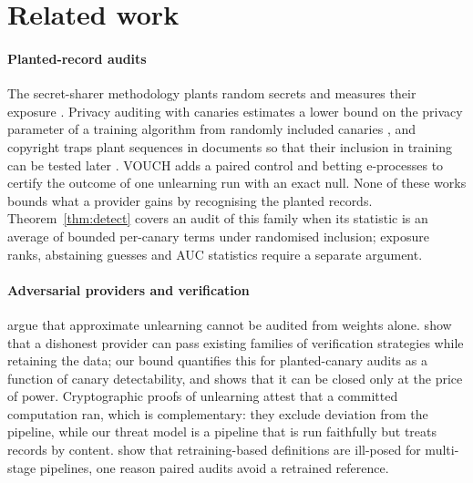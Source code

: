 \section{Related work}\label{sec:related}

\paragraph{Planted-record audits} The secret-sharer methodology plants random secrets and
measures their exposure \citep{carlini2019secret}. Privacy auditing with canaries estimates a
lower bound on the privacy parameter of a training algorithm from randomly included canaries
\citep{steinke2023privacy}, and copyright traps plant sequences in documents so that their
inclusion in training can be tested later \citep{meeus2024traps}. VOUCH
\citep{dang2026vouch} adds a paired control and betting e-processes
\citep{waudbysmith2024,ramdas2023game,shafer2021testing,grunwald2024safe} to certify the
outcome of one unlearning run with an exact null. None of these works bounds what a provider gains
by recognising the planted records. Theorem~\ref{thm:detect} covers an audit of this family
when its statistic is an average of bounded per-canary terms under randomised inclusion;
exposure ranks, abstaining guesses and AUC statistics require a separate argument.

\paragraph{Adversarial providers and verification} \citet{thudi2022necessity} argue that
approximate unlearning cannot be audited from weights alone. \citet{zhang2024verification}
show that a dishonest provider can pass existing families of verification strategies while
retaining the data; our bound quantifies this for planted-canary audits as a function of
canary detectability, and shows that it can be closed only at the price of power.
Cryptographic proofs of unlearning \citep{eisenhofer2025verifiable} attest that a committed
computation ran, which is complementary: they exclude deviation from the pipeline, while our
threat model is a pipeline that is run faithfully but treats records by content.
\citet{yu2025impossibility} show that retraining-based definitions are ill-posed for
multi-stage pipelines, one reason paired audits avoid a retrained reference.

